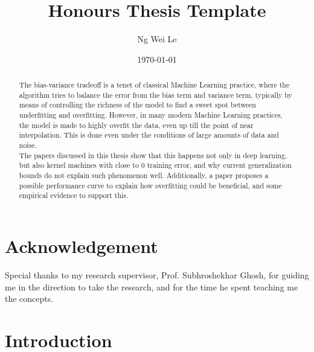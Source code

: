 \documentclass[twoside]{memoir}
\title{Honours Thesis Template}
\author{Ng Wei Le}
\date{\today}
\begin{document}
	\frontmatter
	
	
\maketitle

\chapter{Acknowledgement}
Special thanks to my research supervisor, Prof. Subhroshekhar Ghosh, for guiding me in the direction to take the research, and for the time he spent teaching me the concepts.
	
\begin{abstract}
	The bias-variance tradeoff is a tenet of classical Machine Learning practice, where the algorithm tries to balance the error from the bias term and variance term, typically by means of controlling the richness of the model to find a sweet spot between underfitting and overfitting. However, in many modern Machine Learning practices, the model is made to highly overfit the data, even up till the point of near interpolation. This is done even under the conditions of large amounts of data and noise.\\
	The papers discussed in this thesis show that this happens not only in deep learning, but also kernel machines with close to 0 training error, and why current generalization bounds do not explain such phenomenon well. Additionally, a paper proposes a possible performance curve to explain how overfitting could be beneficial, and some empirical evidence to support this.
\end{abstract}
	
\tableofcontents


\mainmatter

\chapter{Introduction}
\end{document}
